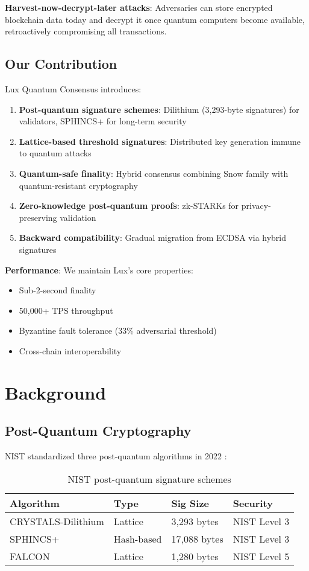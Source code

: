 \documentclass[11pt,letterpaper]{article}
\begin{document}
\textbf{Harvest-now-decrypt-later attacks}: Adversaries can store encrypted blockchain data today and decrypt it once quantum computers become available, retroactively compromising all transactions.

\subsection{Our Contribution}

Lux Quantum Consensus introduces:

\begin{enumerate}
    \item \textbf{Post-quantum signature schemes}: Dilithium (3,293-byte signatures) for validators, SPHINCS+ for long-term security
    \item \textbf{Lattice-based threshold signatures}: Distributed key generation immune to quantum attacks
    \item \textbf{Quantum-safe finality}: Hybrid consensus combining Snow family with quantum-resistant cryptography
    \item \textbf{Zero-knowledge post-quantum proofs}: zk-STARKs for privacy-preserving validation
    \item \textbf{Backward compatibility}: Gradual migration from ECDSA via hybrid signatures
\end{enumerate}

\textbf{Performance}: We maintain Lux's core properties:
\begin{itemize}
    \item Sub-2-second finality
    \item 50,000+ TPS throughput
    \item Byzantine fault tolerance (33\% adversarial threshold)
    \item Cross-chain interoperability
\end{itemize}

\section{Background}

\subsection{Post-Quantum Cryptography}

NIST standardized three post-quantum algorithms in 2022 \cite{nist2022}:

\begin{table}[h]
\centering
\begin{tabular}{llll}
\toprule
\textbf{Algorithm} & \textbf{Type} & \textbf{Sig Size} & \textbf{Security} \\
\midrule
CRYSTALS-Dilithium & Lattice & 3,293 bytes & NIST Level 3 \\
SPHINCS+ & Hash-based & 17,088 bytes & NIST Level 3 \\
FALCON & Lattice & 1,280 bytes & NIST Level 5 \\
\bottomrule
\end{tabular}
\caption{NIST post-quantum signature schemes}
\end{table}
\end{document}
